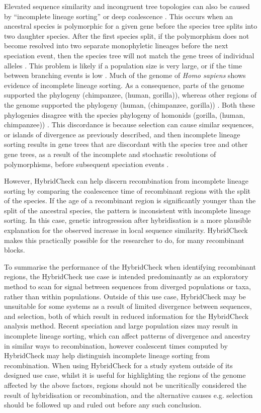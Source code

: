Elevated sequence similarity and incongruent tree topologies can also be caused by “incomplete lineage sorting” or deep coalescence \parencite{Rogers2014ComparativeDynamics}.
This occurs when an ancestral species is polymorphic for a given gene before the species tree splits into two daughter species.
After the first species split, if the polymorphism does not become resolved into two separate monophyletic lineages before the next speciation event, then the species tree will not match the gene trees of individual alleles \parencite{Rogers2014ComparativeDynamics}.
This problem is likely if a population size is very large, or if the time between branching events is low \parencite{Rogers2014ComparativeDynamics}.
Much of the genome of \textit{Homo sapiens} shows evidence of incomplete lineage sorting.
As a consequence, parts of the genome supported the phylogeny (chimpanzee, (human, gorilla)), whereas other regions of the genome supported the phylogeny (human, (chimpanzee, gorilla)) \parencite{Galtier2008}.
Both these phylogenies disagree with the species phylogeny of homonids (gorilla, (human, chimpanzee)) \parencite{Galtier2008,Rogers2014ComparativeDynamics}.
This discordance is because selection can cause similar sequences, or islands of divergence as previously described, and then incomplete lineage sorting results in gene trees that are discordant with the species tree and other gene trees, as a result of the incomplete and stochastic resolutions of polymorphisms, before subsequent speciation events \parencite{Scally2012}.

However, HybridCheck can help discern recombination from incomplete lineage sorting by comparing the coalescence time of recombinant regions with the split of the species.
If the age of a recombinant region is significantly younger than the split of the ancestral species, the pattern is inconsistent with incomplete lineage sorting.
In this case, genetic introgression after hybridisation is a more plausible explanation for the observed increase in local sequence similarity.
HybridCheck makes this practically possible for the researcher to do, for many recombinant blocks.

To summarise the performance of the HybridCheck when identifying recombinant regions, the HybridCheck use case is intended predominantly as an exploratory method to scan for signal between sequences from diverged populations or taxa, rather than within populations.
Outside of this use case, HybridCheck may be unsuitable for some systems as a result of limited divergence between sequences, and selection, both of which result in reduced information for the HybridCheck analysis method. 
Recent speciation and large population sizes may result in incomplete lineage sorting, which can affect patterns of divergence and ancestry in similar ways to recombination, however coalescent times computed by HybridCheck may help distinguish incomplete lineage sorting from recombination.
When using HybridCheck for a study system outside of its designed use case, whilst it is useful for highlighting the regions of the genome affected by the above factors, regions should not be uncritically considered the result of hybridisation or recombination, and the alternative causes e.g. selection should be followed up and ruled out before any such conclusion. 

